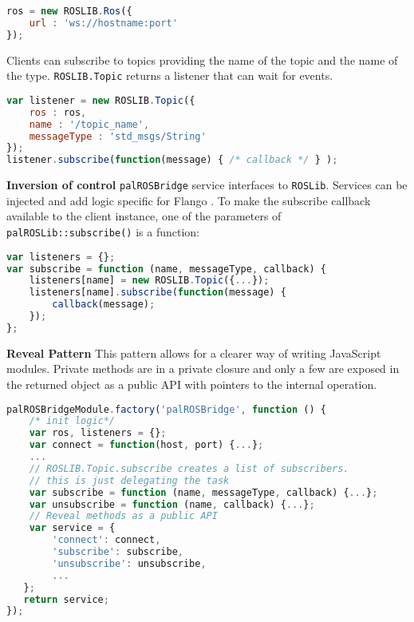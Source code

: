 \begin{lstlisting}[caption=ROSLibJS connect method, label=impl-flango-ros-roslib-connect, language=javascript]
ros = new ROSLIB.Ros({
    url : 'ws://hostname:port'
});
\end{lstlisting}

Clients can subscribe to topics providing the name of the topic and the name of the type.
\texttt{ROSLIB.Topic} returns a listener that can wait for events.

\begin{lstlisting}[caption=ROSLibJS subscribe method, label=impl-flango-ros-roslib-subscribe, language=javascript]
var listener = new ROSLIB.Topic({
    ros : ros,
    name : '/topic_name',
    messageType : 'std_msgs/String'
});
listener.subscribe(function(message) { /* callback */ } );
\end{lstlisting}

\textbf{Inversion of control} \texttt{palROSBridge} service interfaces to \texttt{ROSLib}.
Services can be injected and add logic specific for Flango \cm .
To make the subscribe callback available to the client instance, one of the parameters of \texttt{palROSLib::subscribe()} is a function:

\begin{lstlisting}[language=JavaScript, caption=palROSLib subscribe method, label=impl-flango-ros-palroslib-subscribe]
var listeners = {};
var subscribe = function (name, messageType, callback) {
    listeners[name] = new ROSLIB.Topic({...});
    listeners[name].subscribe(function(message) {
        callback(message);
    });
};
\end{lstlisting}

\textbf{Reveal Pattern} This pattern allows for a clearer way of writing JavaScript modules.
Private methods are in a private closure and only a few are exposed in the returned object as a public \ac{API} with pointers to the internal operation.

\begin{lstlisting}[language=JavaScript, caption=Reveal Pattern in palROSBridge, label=impl-flango-ros-palroslib-reveal]
palROSBridgeModule.factory('palROSBridge', function () {
    /* init logic*/
    var ros, listeners = {};
    var connect = function(host, port) {...};
    ...
    // ROSLIB.Topic.subscribe creates a list of subscribers.
    // this is just delegating the task
    var subscribe = function (name, messageType, callback) {...};
    var unsubscribe = function (name, callback) {...};
    // Reveal methods as a public API
    var service = {
        'connect': connect,
        'subscribe': subscribe,
        'unsubscribe': unsubscribe,
        ...
   };
   return service;
});
\end{lstlisting}